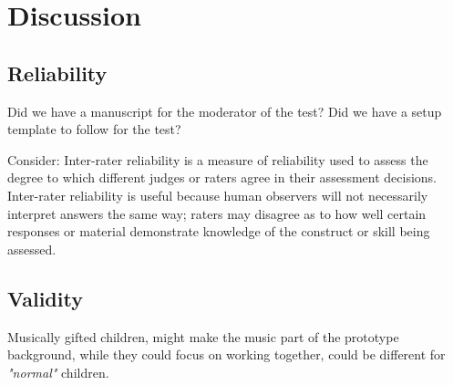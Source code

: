 \chapter{Discussion}
    \section{Reliability}
    
        Did we have a manuscript for the moderator of the test?
        Did we have a setup template to follow for the test?
        
        Consider: Inter-rater reliability is a measure of reliability used to assess the degree to which different judges or raters agree in their assessment decisions.  Inter-rater reliability is useful because human observers will not necessarily interpret answers the same way; raters may disagree as to how well certain responses or material demonstrate knowledge of the construct or skill being assessed.
    \section{Validity}
        Musically gifted children, might make the music part of the prototype background, while they could focus on working together, could be different for \textit{"normal"} children.
        